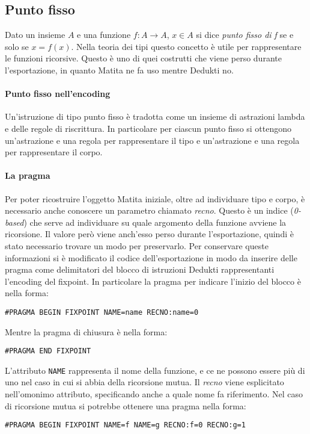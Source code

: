 \documentclass[12pt,a4paper]{report}
\begin{document}
\subsection{Punto fisso}
Dato un insieme $A$ e una funzione $f: A \rightarrow A$, $x \in A$ si dice
\textit{punto fisso di f} se e solo se $x = f(x)$. Nella teoria dei tipi 
questo concetto è utile per rappresentare le funzioni ricorsive.
Questo è uno di quei costrutti che viene perso durante l'esportazione, in 
quanto Matita ne fa uso mentre Dedukti no.

\paragraph{Punto fisso nell'encoding} Un'istruzione di tipo punto fisso è tradotta
come un insieme di astrazioni lambda e delle regole di riscrittura. In particolare
per ciascun punto fisso si ottengono un'astrazione e una regola per rappresentare
il tipo e un'astrazione e una regola per rappresentare il corpo.

\paragraph{La pragma} Per poter ricostruire l'oggetto Matita iniziale, oltre
ad individuare tipo e corpo, è necessario anche conoscere un parametro chiamato
\textit{recno}. Questo è un indice (\textit{0-based}) che serve ad individuare
su quale argomento della funzione avviene la ricorsione. Il valore però viene
anch'esso perso durante l'esportazione, quindi è stato necessario trovare un
modo per preservarlo. Per conservare queste informazioni si è modificato il
codice dell'esportazione in modo da inserire delle pragma come delimitatori
del blocco di istruzioni Dedukti rappresentanti l'encoding del fixpoint.
In particolare la pragma per indicare l'inizio del blocco è nella forma:
\begin{center}
\texttt{\#PRAGMA BEGIN FIXPOINT NAME=name RECNO:name=0}
\end{center}
Mentre la pragma di chiusura è nella forma:
\begin{center}
\texttt{\#PRAGMA END FIXPOINT}
\end{center}

L'attributo \texttt{NAME} rappresenta il nome della funzione, e ce ne possono
essere più di uno nel caso in cui si abbia della ricorsione mutua. Il \textit{recno}
viene esplicitato nell'omonimo attributo, specificando anche a quale nome fa
riferimento. Nel caso di ricorsione mutua si potrebbe ottenere una pragma nella
forma:
\begin{center}
\texttt{\#PRAGMA BEGIN FIXPOINT NAME=f NAME=g RECNO:f=0 RECNO:g=1}
\end{center}
\end{document}
